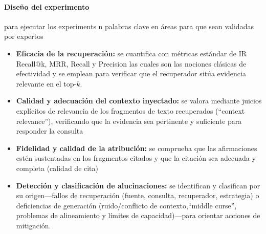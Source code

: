 \paragraph{Diseño del experimento} para ejecutar los experiments n palabras clave en áreas para que sean validadas por
expertos

\begin{itemize}
    \item \textbf{Eficacia de la recuperación:} se cuantifica con métricas estándar de IR Recall@k,
    MRR, Recall y Precision las cuales son las nociones clásicas de efectividad y se emplean para
    verificar que el recuperador sitúa evidencia relevante en el top-$k$.

    \item \textbf{Calidad y adecuación del contexto inyectado:} se valora mediante juicios explícitos de relevancia
    de los fragmentos de texto recuperados (“context relevance”), verificando que la evidencia sea pertinente y suficiente
    para responder la consulta

    \item \textbf{Fidelidad y calidad de la atribución:} se comprueba que las afirmaciones estén sustentadas en los
    fragmentos citados y que la citación sea adecuada y completa (calidad de cita)

    \item \textbf{Detección y clasificación de alucinaciones:} se identifican y clasifican por su origen—fallos de
    recuperación (fuente, consulta, recuperador, estrategia) o deficiencias de generación (ruido/conflicto de
    contexto,“middle curse”, problemas de alineamiento y límites de capacidad)—para orientar acciones de mitigación.
\end{itemize}


